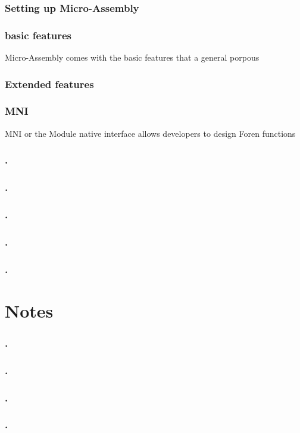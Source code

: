 \documentclass[a4paper,11pt]{book}
\begin{document}
\subsection{Setting up Micro-Assembly}\label{setup:masm}
\subsection{basic features}
Micro-Assembly comes with the basic features that a general porpous	
\subsection{Extended features}
\subsection{MNI}\label{subpar:MNI}
MNI or the Module native interface allows developers to design Foren functions
\subsection{.}
\subsection{.}
\subsection{.}
\subsection{.}
\subsection{.}

\chapter{Notes}

\subsection{.}
\subsection{.}
\subsection{.}
\subsection{.}
\end{document}
